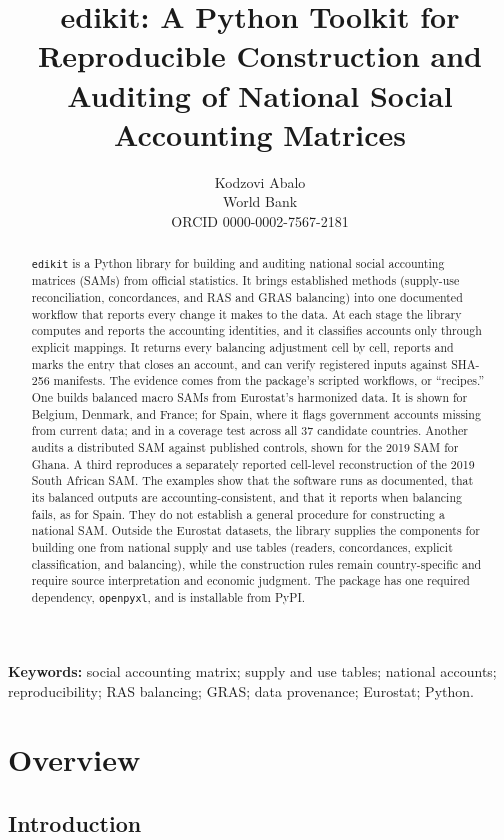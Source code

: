 \documentclass[11pt,a4paper]{article}
\title{edikit: A Python Toolkit for Reproducible Construction and
Auditing of National Social Accounting Matrices}
\author{Kodzovi Abalo\\
\normalsize World Bank\\
\normalsize ORCID 0000-0002-7567-2181}
\date{}
\begin{document}
\maketitle

\begin{abstract}
\noindent
\texttt{edikit} is a Python library for building and auditing national
social accounting matrices (SAMs) from official statistics. It brings
established methods (supply-use reconciliation, concordances, and RAS
and GRAS balancing) into one documented workflow that reports every change
it makes to the data. At each stage the library computes and reports the
accounting identities, and it classifies accounts only through explicit
mappings. It returns every balancing adjustment cell by cell, reports and
marks the entry that closes an account, and can verify registered inputs
against SHA-256 manifests. The evidence comes from the package's scripted
workflows, or ``recipes.'' One builds balanced macro SAMs from
Eurostat's harmonized data. It is shown for Belgium, Denmark, and France;
for Spain, where it flags government accounts missing from current data;
and in a coverage test across all 37 candidate countries. Another audits a distributed SAM against published
controls, shown for the 2019 SAM for Ghana. A third reproduces a
separately reported cell-level reconstruction of the 2019 South African
SAM. The examples show that the software runs as documented, that its
balanced outputs are accounting-consistent, and that it reports when
balancing fails, as for Spain. They do not establish a general procedure for
constructing a national SAM. Outside the Eurostat datasets, the library
supplies the components for building one from national supply and use
tables (readers, concordances, explicit classification, and balancing),
while the construction rules remain country-specific and require source
interpretation and economic judgment. The package has one required
dependency, \texttt{openpyxl}, and is installable from PyPI.
\end{abstract}

\vspace{0.5em}
\noindent\textbf{Keywords:} social accounting matrix; supply and use
tables; national accounts; reproducibility; RAS balancing; GRAS; data
provenance; Eurostat; Python.

\section{Overview}

\subsection{Introduction}
\end{document}
